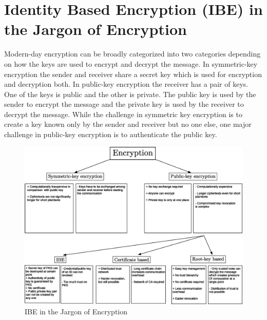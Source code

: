 \documentclass[lnicst,sechang,a4paper]{svmultln}
\begin{document}
\section{Identity Based Encryption (IBE) in the Jargon of Encryption} \label{sec:id_based_crypto}
Modern-day encryption can be broadly categorized into two categories depending on how the keys are used to encrypt and decrypt the message. In symmetric-key encryption the sender and receiver share a secret key which is used for encryption and decryption both. In public-key encryption the receiver has a pair of keys. One of the keys is public and the other is private. The public key is used by the sender to encrypt the message and the private key is used by the receiver to decrypt the message. While the challenge in symmetric key encryption is to create a key known only by the sender and receiver but no one else, one major challenge in public-key encryption is to authenticate the public key.

\begin{figure}
\begin{center}
  \includegraphics[width=.98\textwidth]{ibc_in_jargon_of_crypto.eps}
\caption{IBE in the Jargon of Encryption}
\label{fig:ibe_in_the_jargon_of_cryptography}       %
\end{center}
\end{figure}
\end{document}
